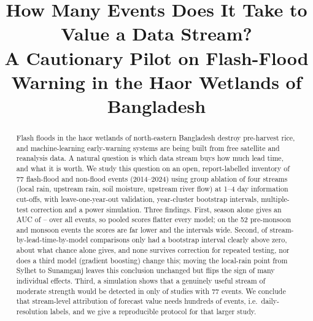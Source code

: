 \title{How Many Events Does It Take to Value a Data Stream?\\
A Cautionary Pilot on Flash-Flood Warning in the Haor Wetlands of Bangladesh}

\author{
}

\maketitle

\begin{abstract}
Flash floods in the haor wetlands of north-eastern Bangladesh destroy pre-harvest rice, and machine-learning early-warning systems are being built from free satellite and reanalysis data. A natural question is which data stream buys how much lead time, and what it is worth. We study this question on an open, report-labelled inventory of 77 flash-flood and non-flood events (2014--2024) using group ablation of four streams (local rain, upstream rain, soil moisture, upstream river flow) at 1--4 day information cut-offs, with leave-one-year-out validation, year-cluster bootstrap intervals, multiple-test correction and a power simulation. Three findings. First, season alone gives an AUC of \seasonAUCallLo--\seasonAUCallHi{} over all events, so pooled scores flatter every model; on the 52 pre-monsoon and monsoon events the scores are far lower and the intervals wide. Second, of \nCells{} stream-by-lead-time-by-model comparisons only \nSigPos{} had a bootstrap interval clearly above zero, about what chance alone gives, and none survives correction for repeated testing, nor does a third model (gradient boosting) change this; moving the local-rain point from Sylhet to Sunamganj leaves this conclusion unchanged but flips the sign of many individual effects. Third, a simulation shows that a genuinely useful stream of moderate strength would be detected in only \powerModAtN{} of studies with 77 events. We conclude that stream-level attribution of forecast value needs hundreds of events, i.e.\ daily-resolution labels, and we give a reproducible protocol for that larger study.
\end{abstract}


